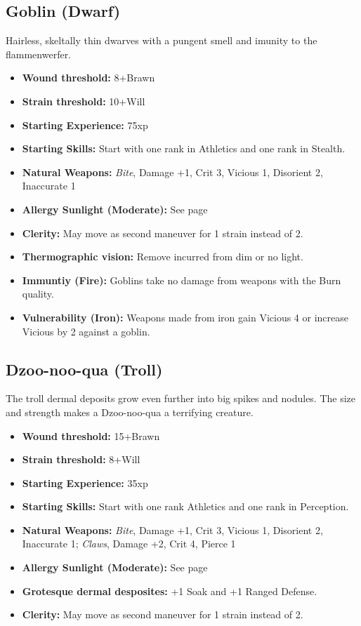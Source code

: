 \documentclass{book}
\begin{document}
\begin{multicols}{2}
	\subsection{Goblin (Dwarf)}
	Hairless, skeltally thin dwarves with a pungent smell and imunity to the flammenwerfer.
	
	\begin{itemize}
		\item \textbf{Wound threshold:} 8+Brawn
		\item \textbf{Strain threshold:} 10+Will
		\item \textbf{Starting Experience:} 75xp
		\item \textbf{Starting Skills:} Start with one rank in Athletics and one rank in Stealth.
		\item \textbf{Natural Weapons:} \textit{Bite}, Damage +1, Crit 3, Vicious 1, Disorient 2,  Inaccurate 1
		\item \textbf{Allergy Sunlight (Moderate):} See page \pageref{allergysunlight} 
		\item \textbf{Clerity:} May move as second maneuver for 1 strain instead of 2.	
		\item \textbf{Thermographic vision:} Remove \SetbackDie \SetbackDie incurred from dim or no light.
		\item \textbf{Immuntiy (Fire):} Goblins take no damage from weapons with the Burn quality.
		\item \textbf{Vulnerability (Iron):} Weapons made from iron gain Vicious 4 or increase Vicious by 2 against a goblin.
	\end{itemize}
	
	\subsection{Dzoo-noo-qua (Troll)}
	The troll dermal deposits grow even further into big spikes and nodules. The size and strength makes a Dzoo-noo-qua a terrifying creature. 
	
	\begin{itemize}
		\item \textbf{Wound threshold:} 15+Brawn
		\item \textbf{Strain threshold:} 8+Will
		\item \textbf{Starting Experience:} 35xp
		\item \textbf{Starting Skills:} Start with one rank Athletics and one rank in Perception.
		\item \textbf{Natural Weapons:} \textit{Bite}, Damage +1, Crit 3, Vicious 1, Disorient 2, Inaccurate 1; \textit{Claws}, Damage +2, Crit 4, Pierce 1
		\item \textbf{Allergy Sunlight (Moderate):} See page \pageref{allergysunlight}
		\item \textbf{Grotesque dermal desposites:} +1 Soak and +1 Ranged Defense.
		\item \textbf{Clerity:} May move as second maneuver for 1 strain instead of 2.	
	\end{itemize}



\end{multicols}
\end{document}
